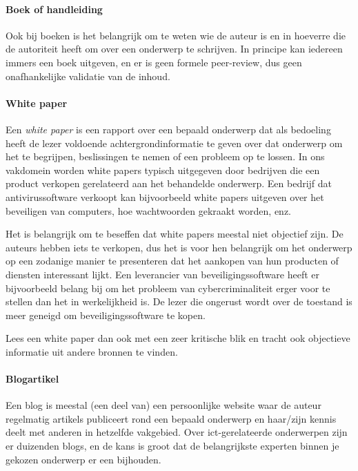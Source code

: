 \paragraph{Boek of handleiding}

Ook bij boeken is het belangrijk om te weten wie de auteur is en in hoeverre die de autoriteit heeft om over een onderwerp te schrijven. In principe kan iedereen immers een boek uitgeven, en er is geen formele peer-review, dus geen onafhankelijke validatie van de inhoud.


\paragraph{White paper}

Een \emph{white paper} is een rapport over een bepaald onderwerp dat als bedoeling heeft de lezer voldoende achtergrondinformatie te geven over dat onderwerp om het te begrijpen, beslissingen te nemen of een probleem op te lossen. In ons vakdomein worden white papers typisch uitgegeven door bedrijven die een product verkopen gerelateerd aan het behandelde onderwerp. Een bedrijf dat antivirussoftware verkoopt kan bijvoorbeeld white papers uitgeven over het beveiligen van computers, hoe wachtwoorden gekraakt worden, enz.

Het is belangrijk om te beseffen dat white papers meestal niet objectief zijn. De auteurs hebben iets te verkopen, dus het is voor hen belangrijk om het onderwerp op een zodanige manier te presenteren dat het aankopen van hun producten of diensten interessant lijkt. Een leverancier van beveiligingssoftware heeft er bijvoorbeeld belang bij om het probleem van cybercriminaliteit erger voor te stellen dan het in werkelijkheid is. De lezer die ongerust wordt over de toestand is meer geneigd om beveiligingssoftware te kopen.

Lees een white paper dan ook met een zeer kritische blik en tracht ook objectieve informatie uit andere bronnen te vinden.

\paragraph{Blogartikel}

Een blog is meestal (een deel van) een persoonlijke website waar de auteur regelmatig artikels publiceert rond een bepaald onderwerp en haar/zijn kennis deelt met anderen in hetzelfde vakgebied. Over ict-gerelateerde onderwerpen zijn er duizenden blogs, en de kans is groot dat de belangrijkste experten binnen je gekozen onderwerp er een bijhouden.

